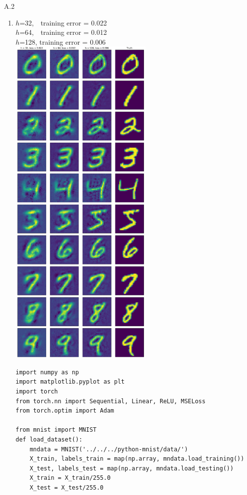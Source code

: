\documentclass{article}
\begin{document}
A.2
\begin{enumerate}
        \item
        \begin{multicols}{2}
                $h$=32, ~\,training error = 0.022 \\
                $h$=64, ~\,training error = 0.012 \\
                $h$=128, training error = 0.006 \\
                \includegraphics[width=0.55\textwidth]{code/A2a.pdf}
        \end{multicols}
        \begin{verbatim}
import numpy as np
import matplotlib.pyplot as plt
import torch
from torch.nn import Sequential, Linear, ReLU, MSELoss
from torch.optim import Adam

from mnist import MNIST
def load_dataset():
    mndata = MNIST('../../../python-mnist/data/')
    X_train, labels_train = map(np.array, mndata.load_training())
    X_test, labels_test = map(np.array, mndata.load_testing())
    X_train = X_train/255.0
    X_test = X_test/255.0
    

\end{verbatim}
\end{enumerate}
\end{document}

